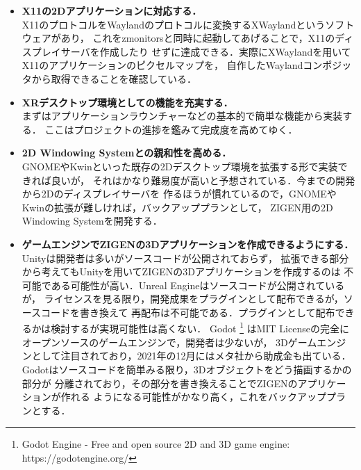 \begin{itemize}
      \item \textbf{X11の2Dアプリケーションに対応する．\\}
            X11のプロトコルをWaylandのプロトコルに変換するXWaylandというソフトウェアがあり，
            これをzmonitorsと同時に起動してあげることで，X11のディスプレイサーバを作成したり
            せずに達成できる．実際にXWaylandを用いてX11のアプリケーションのピクセルマップを，
            自作したWaylandコンポジッタから取得できることを確認している．

      \item \textbf{XRデスクトップ環境としての機能を充実する．\\}
            まずはアプリケーションラウンチャーなどの基本的で簡単な機能から実装する．
            ここはプロジェクトの進捗を鑑みて完成度を高めてゆく．

      \item \textbf{2D Windowing Systemとの親和性を高める．\\}
            GNOMEやKwinといった既存の2Dデスクトップ環境を拡張する形で実装できれば良いが，
            それはかなり難易度が高いと予想されている．今までの開発から2Dのディスプレイサーバを
            作るほうが慣れているので，GNOMEやKwinの拡張が難しければ，バックアッププランとして，
            ZIGEN用の2D Windowing Systemを開発する．

      \item \textbf{ゲームエンジンでZIGENの3Dアプリケーションを作成できるようにする．\\}
            Unityは開発者は多いがソースコードが公開されておらず，
            拡張できる部分から考えてもUnityを用いてZIGENの3Dアプリケーションを作成するのは
            不可能である可能性が高い．Unreal Engineはソースコードが公開されているが，
            ライセンスを見る限り，開発成果をプラグインとして配布できるが，ソースコードを書き換えて
            再配布は不可能である．プラグインとして配布できるかは検討するが実現可能性は高くない．
            Godot
            \footnote{Godot Engine - Free and open source 2D and 3D game engine: https://godotengine.org/}
            はMIT Licenseの完全にオープンソースのゲームエンジンで，開発者は少ないが，
            3Dゲームエンジンとして注目されており，2021年の12月にはメタ社から助成金も出ている．
            Godotはソースコードを簡単みる限り，3Dオブジェクトをどう描画するかの部分が
            分離されており，その部分を書き換えることでZIGENのアプリケーションが作れる
            ようになる可能性がかなり高く，これをバックアッププランとする．


\end{itemize}

